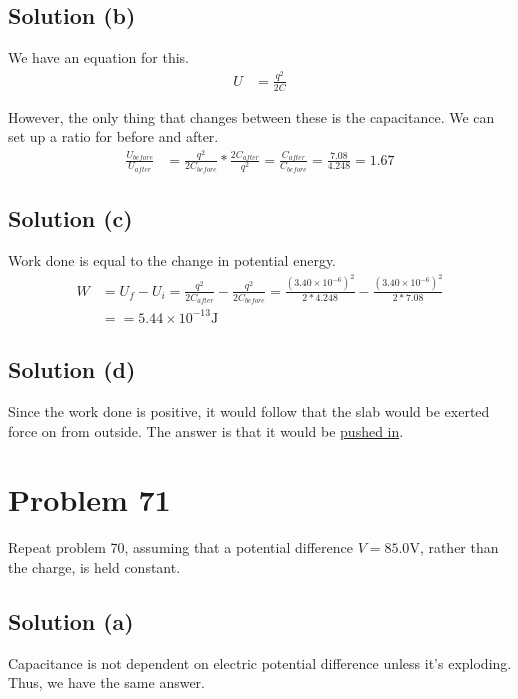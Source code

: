 \documentclass[12pt]{article}
\begin{document}
\subsection*{Solution (b)}
We have an equation for this.
\begin{align*}
    U   &=  \frac{q^2}{2C}
\end{align*}

However, the only thing that changes between these is the capacitance.
We can set up a ratio for before and after.
\begin{align*}
    \frac{U_{before}}{U_{after}}    &=  \frac{q^2}{2C_{before}} * \frac{2C_{after}}{q^2}
        =   \frac{C_{after}}{C_{before}}
        =   \frac{7.08}{4.248}
        =   \boxed{1.67}
\end{align*}

\subsection*{Solution (c)}
Work done is equal to the change in potential energy.
\begin{align*}
    W   &=  U_f - U_i
        =   \frac{q^2}{2C_{after}} - \frac{q^2}{2C_{before}}
        =   \frac{(3.40 \times 10^{-6})^2}{2*4.248} - \frac{(3.40 \times 10^{-6})^2}{2*7.08}\\
        &=  
        =   \boxed{5.44 \times 10^{-13} \unit{\joule}}
\end{align*}

\subsection*{Solution (d)}
Since the work done is positive, it would follow that the slab would be exerted force on from outside. 
The answer is that it would be \underline{pushed in}.
\section*{Problem 71}
Repeat problem 70, assuming that a potential difference $V = 85.0 \unit{\volt}$, rather than the charge, is held constant.

\subsection*{Solution (a)}
Capacitance is not dependent on electric potential difference unless it's exploding. 
Thus, we have the same answer.
\end{document}
